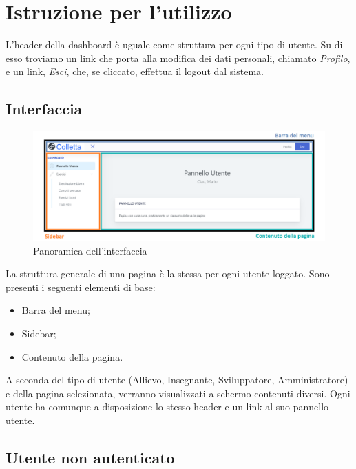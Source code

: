 \section{Istruzione per l'utilizzo}
  L'header della {dashboard} è uguale come struttura per ogni tipo di utente. Su di esso troviamo un link che porta alla modifica dei dati personali, chiamato \textit{Profilo}, e un link, \textit{Esci}, che, se cliccato, effettua il logout dal sistema.



\subsection{Interfaccia}
    \begin{figure}[H]
        \centering
        \includegraphics[width=17cm]{sez/img/istruzioni/panoramica.png} 
        \caption{Panoramica dell'interfaccia}\label{fig:1}
    \end{figure}
  La struttura generale di una pagina è la stessa per ogni utente loggato. Sono presenti i seguenti elementi di base:
    \begin{itemize}
        \item Barra del menu;
        \item {Sidebar};
        \item Contenuto della pagina.
    \end{itemize}
 A seconda del tipo di utente (Allievo, Insegnante, Sviluppatore, Amministratore) e della pagina selezionata, verranno visualizzati a schermo contenuti diversi. Ogni utente ha comunque a disposizione lo stesso header e un link al suo pannello utente.


\subsection{Utente non autenticato}
